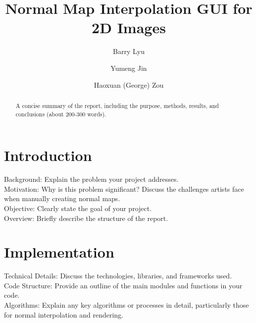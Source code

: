 \documentclass[format=sigconf, review=false, nonacm=true]{acmart}
\begin{document}
\title{Normal Map Interpolation GUI for 2D Images}

\author{Barry Lyu}

\author{Yumeng Jin}

\author{Haoxuan (George) Zou}

\renewcommand{\shortauthors}{Barry Lyu et al.}

\begin{abstract}
  A concise summary of the report, including the purpose, methods, results, and conclusions (about 200-300 words).
\end{abstract}

\maketitle

\section{Introduction}
Background: Explain the problem your project addresses.\\
Motivation: Why is this problem significant? Discuss the challenges artists face when manually creating normal maps.\\
Objective: Clearly state the goal of your project.\\
Overview: Briefly describe the structure of the report.

\section{Implementation}
Technical Details: Discuss the technologies, libraries, and frameworks used.\\
Code Structure: Provide an outline of the main modules and functions in your code.\\
Algorithms: Explain any key algorithms or processes in detail, particularly those for normal interpolation and rendering.
\end{document}
